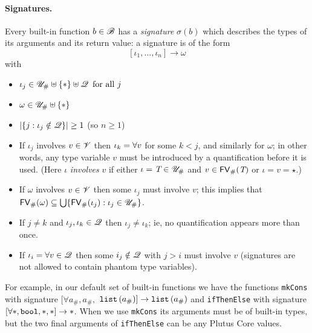\paragraph{Signatures.}
Every built-in function $b \in \mathscr{B}$ has a \textit{signature} $\sigma(b)$ which describes
the types of its arguments and its return value: a signature is of the form
$$[\iota_1, \ldots, \iota_n] \rightarrow \omega$$ with
\begin{itemize}
  \item $\iota_j \in \UnihashStar \disj \QVar \enspace\text{for all $j$}$
  \item $\omega \in \UnihashStar$
  \item $\lvert\{j : \iota_j \notin \mathscr{Q}\}\rvert \geq 1$ (so $n \geq 1$)
  \item If $\iota_j$ involves $v \in \mathscr{V}$ then $\iota_k = \mathbf{\forall}v$ for
    some $k < j$, and similarly for $\omega$; in other words, any type variable
    $v$ must be introduced by a quantification before it is used. (Here $\iota$
    \textit{involves} $v$ if either $\iota = \textit{T} \in {\mathscr{U}_{\#}}$ and $v \in \mathsf{FV}_{\#}(\textit{T})$
    or $\iota = v = \star$.)
  \item If $\omega$ involves $v \in \mathscr{V}$ then some $\iota_j$ must involve $v$;
    this implies that $\mathsf{FV}_{\#}(\omega) \subseteq \bigcup \{\mathsf{FV}_{\#}(\iota_j): \iota_j \in
    {\mathscr{U}_{\#}}\}$.
  \item If $j \neq k$ and $\iota_j, \iota_k \in \mathscr{Q}$ then $\iota_j \neq
    \iota_k$; ie, no quantification appears more than once.
  \item If $\iota_i = \forall v \in \mathscr{Q}$ then some $i_j \notin \mathscr{Q}$ with $j
    > i$ must involve $v$ (signatures are not allowed to contain phantom type variables).
\end{itemize}%
%
%



\noindent For example, in our default set of built-in functions we have the
functions \texttt{mkCons} with signature $[\forall a_\#, a_\#,$  %
  $\mathtt{list}\,\mathtt{(}a_\#\mathtt{)}] \rightarrow \mathtt{list}\,\mathtt{(}a_\#\mathtt{)}$ and \texttt{ifThenElse} with signature
$[\forallStar, \mathtt{bool}, \star, \star] \rightarrow \star$.  When we use
\texttt{mkCons} its arguments must be of built-in types, but the two final
arguments of \texttt{ifThenElse} can be any Plutus Core values.


